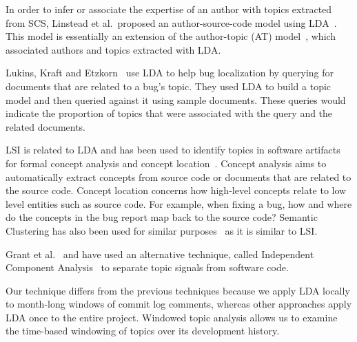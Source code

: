 \documentclass[times, 10pt,twocolumn]{article}
\newcommand{\hla}[1]{{\color{changecolor2} #1 }}
\begin{document}
In order to infer or associate the expertise of an author with topics
extracted from SCS, Linstead et al.\  proposed an author-source-code model
using LDA~\cite{10.1109/MSR.2007.20}.%
  This model
is essentially an extension of the author-topic (AT)
model~\cite{1036902}, which associated authors and topics extracted
with LDA.

Lukins, Kraft and Etzkorn~\cite{lukins2008} use LDA to help bug
localization by querying for documents that are related to a bug's topic. They
used LDA to build a topic model and then queried against it using
sample documents. These queries would indicate the proportion of
topics that were associated with the query and the
related documents.

LSI is related to LDA and has been used to identify topics in software
artifacts for formal concept analysis and concept
location~\cite{1374321,10.1109/ICPC.2007.13}.
Concept analysis aims to automatically extract concepts from source
code or documents that are related to the source code.  Concept location concerns how
high-level concepts relate to low level entities such as source code. For
example, when fixing a bug, how and where do the concepts in the bug
report map back to the source code?  Semantic Clustering has also been
used for similar purposes~\cite{1698774,1566153} as it is similar to
LSI.

Grant et al.~\cite{scottcordy} and have used an alternative technique,
\hla{
called Independent Component Analysis~\cite{delac} to separate topic signals from
}
software code.

Our technique differs from the previous techniques because we apply
LDA locally to month-long windows of commit log comments, whereas
other approaches apply LDA once to the entire project. Windowed topic
analysis allows us to examine the time-based windowing of topics over
its development history.


\end{document}

